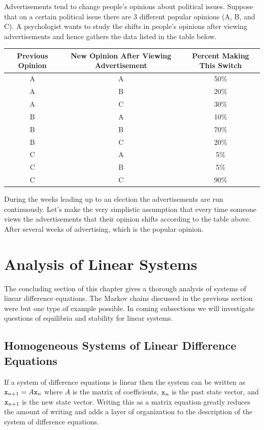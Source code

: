 % 
\begin{problem}
    Advertisements tend to change people's opinions about political issues. Suppose that
    on a certain political issue there are 3 different popular opinions (A, B, and C).  A
    psychologist wants to study the shifts in people's opinions after viewing
    advertisements and hence gathers the data listed in the table below.
    \begin{center}
        \begin{tabular}{|c|c|c|}
            \hline
            Previous Opinion & New Opinion After Viewing Advertisement & Percent Making
            This Switch \\ \hline \hline
            A &A &50\%\\
            A &B &20\%\\
            A &C &30\%\\\hline
            B &A &10\%\\
            B &B &70\%\\
            B &C &20\%\\\hline
            C &A &5\%\\
            C &B &5\%\\
            C &C &90\%\\\hline
        \end{tabular}
    \end{center}

    During the weeks leading up to an election the advertisements are run continuously.
    Let's make the very simplistic assumption that every time someone views the
    advertisements that their opinion shifts according to the table above.  After several
    weeks of advertising, which is the popular opinion.
\end{problem}




\newpage\section{Analysis of Linear Systems}
The concluding section of this chapter gives a thorough analysis of systems of linear difference
equations.  The Markov chains discussed in the previous section were but one type of
example possible.  In coming subsections we will investigate
questions of equilibria and stability for linear systems.

\subsection{Homogeneous Systems of Linear Difference Equations}
If a system of difference equations is linear
then the system can be written as $\texttt{x}_{n+1} = A \texttt{x}_n$ where $A$ is the matrix of
coefficients, $\texttt{x}_n$ is the past state vector, and $\texttt{x}_{n+1}$ is the new state vector.
Writing this as a matrix equation greatly reduces the amount of writing and adds a layer
of organization  to the description of the system of difference equations.

